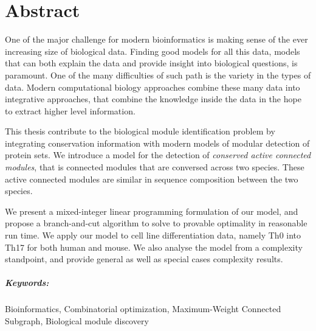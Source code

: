 \documentclass[11pt,a4paper,twoside]{memoir}
\begin{document}
\clearpage

\chapter*{Abstract}

One of the major challenge for modern bioinformatics is making sense of the ever increasing size of biological data.
Finding good models for all this data, models that can both explain the data and provide insight into biological questions, is paramount.
One of the many difficulties of such path is the variety in the types of data.
Modern computational biology approaches combine these many data into integrative approaches, that combine the knowledge inside the data in the hope to extract higher level information.

This thesis contribute to the biological module identification problem by integrating conservation information with modern models of modular detection of protein sets.
We introduce a model for the detection of \emph{conserved active connected modules}, that is connected modules that are conversed across two species.
These active connected modules are similar in sequence composition between the two species.

We present a mixed-integer linear programming formulation of our model, and propose a branch-and-cut algorithm to solve to provable optimality in reasonable run time.
We apply our model to cell line differentiation data, namely Th0 into Th17 for both human and mouse.
We also analyse the model from a complexity standpoint, and provide general as well as special cases complexity results.

\paragraph{Keywords:}Bioinformatics, Combinatorial optimization, Maximum-Weight Connected Subgraph, Biological module discovery

\cleardoublepage


 \tableofcontents*
 \cleardoublepage

 \listoffigures*
 \cleardoublepage

 \listoftables*

\mainmatter


\end{document}
